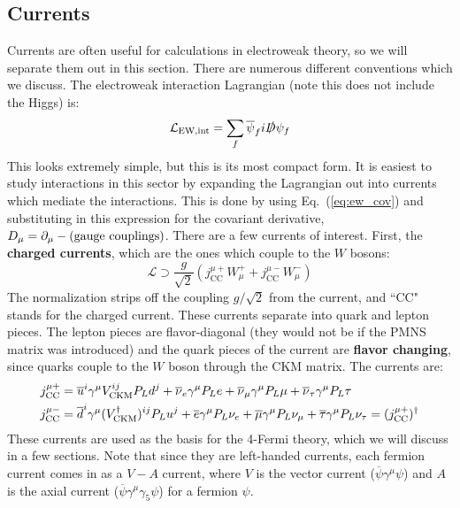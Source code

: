 \documentclass[11pt, oneside]{article}   	%
\theoremstyle{definition}
\numberwithin{equation}{subsection}		%
\begin{document}
\subsection{Currents}


Currents are often useful for calculations in electroweak theory, so we will separate them out in this section. There are 
numerous different conventions which we discuss. The electroweak interaction Lagrangian (note this does not include 
the Higgs) is:
\begin{equation}
	\mathcal L_\mathrm{EW, int} = \sum_f \overline\psi_f i\slashed D\psi_f
\end{equation}
This looks extremely simple, but this is its most compact form. It is easiest to study interactions in this sector by expanding the 
Lagrangian out into currents which mediate the interactions. This is done by using Eq.~(\ref{eq:ew_cov}) and substituting in this 
expression for the covariant derivative, $D_\mu = \partial_\mu - \textnormal{(gauge couplings)}$. There are a few currents of interest.
First, the \textbf{charged currents}, which are the ones which couple to the $W$ bosons:
\begin{equation}
	\mathcal L\supset \frac{g}{\sqrt 2} \left( j^{\mu +}_\mathrm{CC} W_\mu^+ + j^{\mu -}_\mathrm{CC} W_\mu^-\right)
\end{equation}
The normalization strips off the coupling $g / \sqrt 2$ from the current, and ``CC" stands for the charged current. 
These currents separate into quark and lepton pieces. The lepton pieces are flavor-diagonal (they would not 
be if the PMNS matrix was introduced) and the quark pieces of the current are \textbf{flavor changing}, since quarks couple to the $W$ 
boson through the CKM matrix. The currents are:
\begin{align}
	j_{\textnormal{CC}}^{\mu +} &= \overline u^i \gamma^\mu V^{ij}_\mathrm{CKM} P_L d^j +  \overline\nu_e \gamma^\mu P_L e + \overline\nu_\mu 
	\gamma^\mu P_L \mu + \overline\nu_\tau \gamma^\mu P_L \tau \\
	j_{\textnormal{CC}}^{\mu -} &= \overline d^i \gamma^\mu (V_\mathrm{CKM}^\dagger)^{ij} P_L u^j + \overline e \gamma^\mu 
	P_L\nu_e + \overline \mu \gamma^\mu P_L \nu_\mu + \overline\tau \gamma^\mu P_L\nu_\tau = (j_\mathrm{CC}^{\mu +})^\dagger 
\end{align}
These currents are used as the basis for the 4-Fermi theory, which we will discuss in a few sections. Note that since they are left-handed 
currents, each fermion current comes in as a $V - A$ current, where $V$ is the vector current ($\overline\psi\gamma^\mu\psi$) and $A$ is 
the axial current ($\overline\psi\gamma^\mu\gamma_5\psi$) for a fermion $\psi$. 
\end{document}
